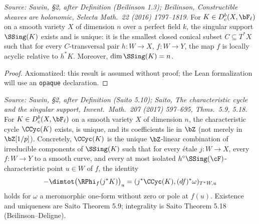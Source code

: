 \begin{theorem}
  \label{thm:beilinson_ss}
  \textit{Source: Sawin, §2, after Definition (Beilinson 1.3); Beilinson,
  \emph{Constructible sheaves are holonomic}, Selecta Math.\ 22 (2016) 1797--1819.}
  For $K\in D^b_c(X,\bF_\ell)$ on a smooth variety $X$ of dimension $n$ over a
  perfect field $k$, the singular support $\SSing(K)$ exists and is unique: it is the
  smallest closed conical subset $C\subseteq T^*X$ such that for every $C$-transversal
  pair $h:W\to X$, $f:W\to Y$, the map $f$ is locally acyclic relative to $h^*K$.
  Moreover, $\dim\SSing(K)=n$.
\end{theorem}

\begin{proof}
  Axiomatized: this result is assumed without proof; the Lean formalization will use
  an \texttt{opaque} declaration.
\end{proof}

\begin{theorem}
  \label{thm:saito_cc_exists}
  \textit{Source: Sawin, §2, after Definition (Saito 5.10); Saito,
  \emph{The characteristic cycle and the singular support}, Invent.\ Math.\ 207
  (2017) 597--695, Thms.\ 5.9, 5.18.}
  For $K\in D^b_c(X,\bF_\ell)$ on a smooth variety $X$ of dimension $n$, the
  characteristic cycle $\CCyc(K)$ exists, is unique, and its coefficients lie in
  $\bZ$ (not merely in $\bZ[1/p]$).  Concretely, $\CCyc(K)$ is the unique
  $\bZ$-linear combination of irreducible components of $\SSing(K)$ such that for
  every étale $j:W\to X$, every $f:W\to Y$ to a smooth curve, and every at most
  isolated $h^\circ\SSing(\cF)$-characteristic point $u\in W$ of $f$, the identity
  \[ -\dimtot\bigl(\RPhi_f(j^*K)\bigr)_u = (j^*\CCyc(K),(df)^*\omega)_{T^*W,u} \]
  holds for $\omega$ a meromorphic one-form without zero or pole at $f(u)$.
  Existence and uniqueness are Saito Theorem 5.9; integrality is Saito Theorem 5.18
  (Beilinson--Deligne).
\end{theorem}

